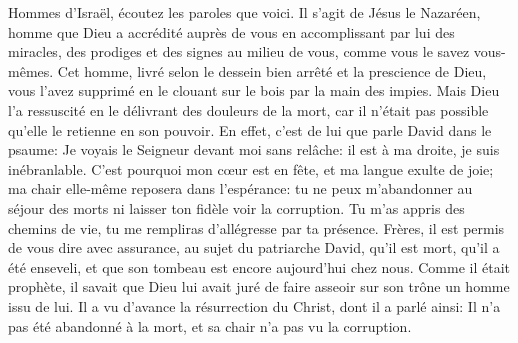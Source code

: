 Hommes d’Israël, écoutez les paroles que voici.
	Il s’agit de Jésus le Nazaréen, homme que Dieu a accrédité auprès de vous
	en accomplissant par lui des miracles, des prodiges et des signes au milieu de vous,
	comme vous le savez vous-mêmes.
Cet homme, livré selon le dessein bien arrêté et la prescience de Dieu,
	vous l’avez supprimé en le clouant sur le bois par la main des impies.
Mais Dieu l’a ressuscité en le délivrant des douleurs de la mort,
	car il n’était pas possible qu’elle le retienne en son pouvoir.
En effet, c’est de lui que parle David dans le psaume:
	Je voyais le Seigneur devant moi sans relâche:
	il est à ma droite, je suis inébranlable.
	C’est pourquoi mon cœur est en fête, et ma langue exulte de joie;
	ma chair elle-même reposera dans l’espérance:
	tu ne peux m’abandonner au séjour des morts
	ni laisser ton fidèle voir la corruption.
	Tu m’as appris des chemins de vie,
	tu me rempliras d’allégresse par ta présence.
Frères, il est permis de vous dire avec assurance, au sujet du patriarche David,
	qu’il est mort, qu’il a été enseveli,
	et que son tombeau est encore aujourd’hui chez nous.
Comme il était prophète, il savait que Dieu lui avait juré
	de faire asseoir sur son trône un homme issu de lui.
Il a vu d’avance la résurrection du Christ, dont il a parlé ainsi:
	Il n’a pas été abandonné à la mort, et sa chair n’a pas vu la corruption.
